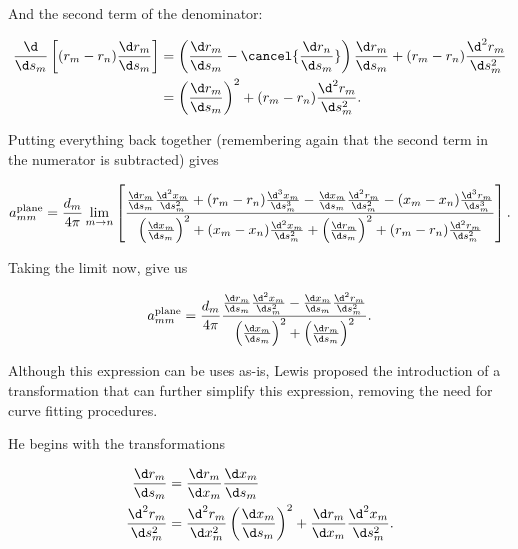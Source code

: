 \noindent And the second term of the denominator:

\begin{equation}
    \begin{aligned}
        \frac{\d}{\d s_m} \left[(r_m-r_n)\frac{\d r_m}{\d s_m}\right] &= \left(\frac{\d r_m}{\d s_m} - \cancel{\frac{\d r_n}{\d s_m}}\right)\frac{\d r_m}{\d s_m}+(r_m-r_n)\frac{\d^2 r_m}{\d s_m^2}\\
        &= \left(\frac{\d r_m}{\d s_m}\right)^2+(r_m-r_n)\frac{\d^2 r_m}{\d s_m^2}.
    \end{aligned}
\end{equation}

\noindent Putting everything back together (remembering again that the second term in the numerator is subtracted) gives

\begin{equation}
    a^\text{plane}_{mm} = \frac{d_m}{4 \pi} \lim_{m\rightarrow n} \left[\frac{\frac{\d r_m}{\d s_m} \frac{\d^2 x_m}{\d s_m^2}+(r_m-r_n)\frac{\d^3 x_m}{\d s_m^3}-\frac{\d x_m}{\d s_m} \frac{\d^2 r_m}{\d s_m^2}-(x_m-x_n)\frac{\d^3 r_m}{\d s_m^3}}{\left(\frac{\d x_m}{\d s_m}\right)^2+(x_m-x_n)\frac{\d^2 x_m}{\d s_m^2}+\left(\frac{\d r_m}{\d s_m}\right)^2+(r_m-r_n)\frac{\d^2 r_m}{\d s_m^2}}\right].
\end{equation}

Taking the limit now, give us

\begin{equation}
    \label{eqn:planarselfinduced1}
    a^\text{plane}_{mm} = \frac{d_m}{4 \pi} \frac{\frac{\d r_m}{\d s_m} \frac{\d^2 x_m}{\d s_m^2}-\frac{\d x_m}{\d s_m} \frac{\d^2 r_m}{\d s_m^2}}{\left(\frac{\d x_m}{\d s_m}\right)^2+\left(\frac{\d r_m}{\d s_m}\right)^2}.
\end{equation}


Although this expression can be uses as-is, Lewis \cite{Lewis_1991} proposed the introduction of a transformation that can further simplify this expression, removing the need for curve fitting procedures.

He begins with the transformations

\begin{align}
    \frac{\d r_m}{\d s_m} &= \frac{\d r_m}{\d x_m}\frac{\d x_m}{\d s_m}\\
    \frac{\d^2 r_m}{\d s_m^2} &= \frac{\d^2 r_m}{\d x_m^2}\left(\frac{\d x_m}{\d s_m}\right)^2 + \frac{\d r_m}{\d x_m}\frac{\d^2 x_m}{\d s_m^2}.
\end{align}

